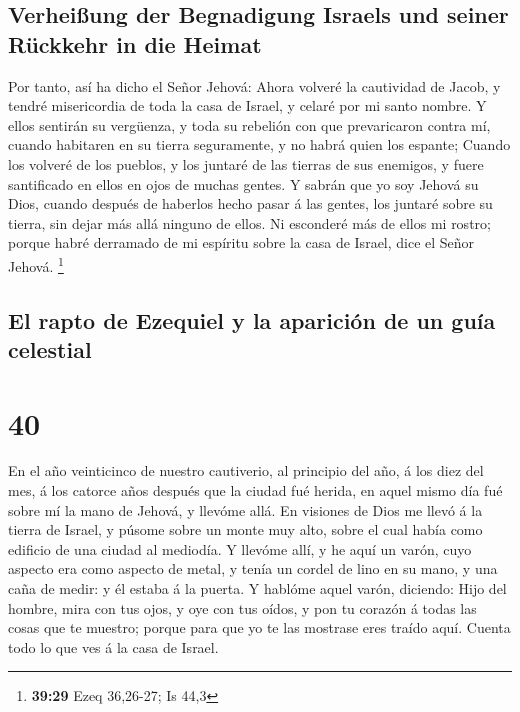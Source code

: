 \hypertarget{verheiuxdfung-der-begnadigung-israels-und-seiner-ruxfcckkehr-in-die-heimat}{%
\subsection{Verheißung der Begnadigung Israels und seiner Rückkehr in
die
Heimat}\label{verheiuxdfung-der-begnadigung-israels-und-seiner-ruxfcckkehr-in-die-heimat}}

 Por tanto, así ha dicho el Señor Jehová: Ahora volveré
la cautividad de Jacob, y tendré misericordia de toda la casa de Israel,
y celaré por mi santo nombre.  Y ellos sentirán su
vergüenza, y toda su rebelión con que prevaricaron contra mí, cuando
habitaren en su tierra seguramente, y no habrá quien los espante;
 Cuando los volveré de los pueblos, y los juntaré de las
tierras de sus enemigos, y fuere santificado en ellos en ojos de muchas
gentes.  Y sabrán que yo soy Jehová su Dios, cuando
después de haberlos hecho pasar á las gentes, los juntaré sobre su
tierra, sin dejar más allá ninguno de ellos.  Ni
esconderé más de ellos mi rostro; porque habré derramado de mi espíritu
sobre la casa de Israel, dice el Señor Jehová. \footnote{\textbf{39:29}
  Ezeq 36,26-27; Is 44,3}

\hypertarget{el-rapto-de-ezequiel-y-la-apariciuxf3n-de-un-guuxeda-celestial}{%
\subsection{El rapto de Ezequiel y la aparición de un guía
celestial}\label{el-rapto-de-ezequiel-y-la-apariciuxf3n-de-un-guuxeda-celestial}}

\hypertarget{section-39}{%
\section{40}\label{section-39}}

 En el año veinticinco de nuestro cautiverio, al principio
del año, á los diez del mes, á los catorce años después que la ciudad
fué herida, en aquel mismo día fué sobre mí la mano de Jehová, y llevóme
allá.  En visiones de Dios me llevó á la tierra de Israel,
y púsome sobre un monte muy alto, sobre el cual había como edificio de
una ciudad al mediodía.  Y llevóme allí, y he aquí un
varón, cuyo aspecto era como aspecto de metal, y tenía un cordel de lino
en su mano, y una caña de medir: y él estaba á la puerta. 
Y hablóme aquel varón, diciendo: Hijo del hombre, mira con tus ojos, y
oye con tus oídos, y pon tu corazón á todas las cosas que te muestro;
porque para que yo te las mostrase eres traído aquí. Cuenta todo lo que
ves á la casa de Israel.

